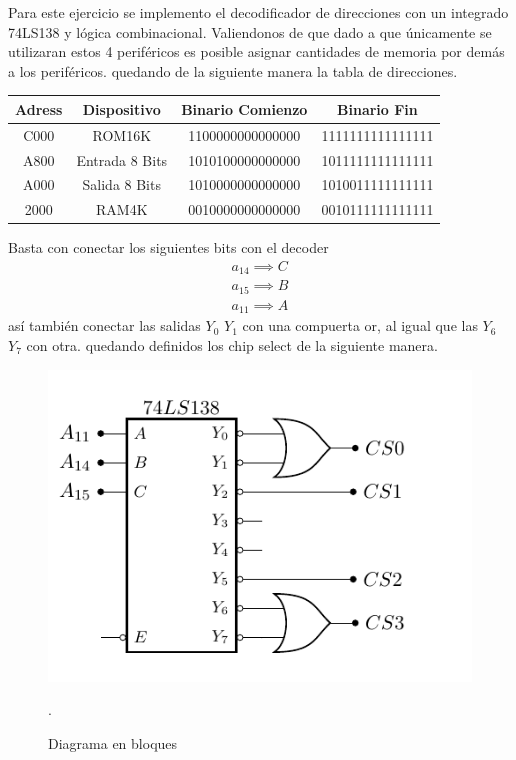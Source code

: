 


Para este ejercicio se implemento el decodificador de direcciones con un integrado 74LS138 y lógica combinacional.
Valiendonos de que dado a que únicamente se utilizaran estos 4 periféricos es posible asignar cantidades de memoria por demás a los periféricos.
quedando de la siguiente manera la tabla de direcciones.
\begin{table}[H]
\centering
\begin{tabular}{|c|c|c|c|}
\hline
Adress & Dispositivo & Binario Comienzo & Binario Fin \\ \hline
C000 & ROM16K & 1100000000000000 & 1111111111111111 \\ \hline
A800 & Entrada 8 Bits & 1010100000000000 & 1011111111111111 \\ \hline
A000 & Salida 8 Bits & 1010000000000000 & 1010011111111111 \\ \hline
2000 & RAM4K & 0010000000000000 & 0010111111111111 \\ \hline
\end{tabular}
\end{table}
Basta con conectar los siguientes bits con el decoder
\begin{align}
a_{14} \implies C\\
a_{15} \implies B\\
a_{11} \implies A
\end{align}
así también conectar las salidas $Y_0$ $Y_1$  con una compuerta or, al igual que las $Y_6$ $Y_7$ con otra.
quedando definidos los chip select de la siguiente manera.

\begin{figure}[H]
  \centering
  \includegraphics[width=.6\textwidth, page = 1]{ImagenesEjercicio2/Circuits.pdf}
  \caption{Diagrama en bloques}.
  \label{fig:fotofea}
\end{figure}

